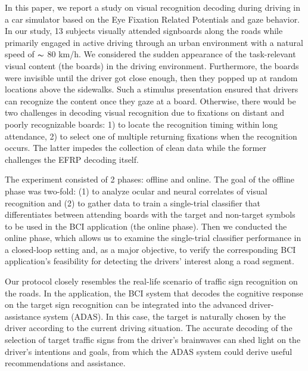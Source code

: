 \documentclass[12pt]{iopart}
\begin{document}
In this paper, we report a study on visual recognition decoding during driving
in a car simulator based on the Eye Fixation Related
Potentials and gaze behavior. 
In our study, 13 subjects visually attended signboards along the roads
while primarily engaged in active driving through
an urban environment with a natural speed of $\thicksim$ 80 km/h. 
We considered the sudden appearance of the task-relevant visual content (the boards) in the driving environment.
Furthermore, the boards were invisible until the driver got close enough,
then they popped up at random locations above the sidewalks.
Such a stimulus presentation ensured 
that drivers can recognize the content once they gaze at a board.
Otherwise, there would be two challenges in decoding
visual recognition due to fixations on distant
and poorly recognizable boards:
1) to locate the recognition timing within long attendance,
2) to select one of multiple returning fixations when the recognition occurs.
The latter impedes the collection of clean data while the former challenges
the EFRP decoding itself.

The experiment consisted of 2 phases: offline and online.
The goal of the offline phase was two-fold: (1) to analyze ocular
and neural correlates of visual recognition and (2) to gather data to train a single-trial classifier that differentiates between attending boards with the target and non-target symbols to be used in the BCI application (the online phase).
Then we conducted the online phase, which allows us to examine the single-trial classifier performance in a closed-loop setting and, as a major objective, to verify the corresponding BCI application's feasibility for detecting the drivers' interest along a road segment.

Our protocol closely resembles the real-life scenario of traffic sign
recognition on the roads. In the application, 
the BCI system that decodes the cognitive response on the target sign
recognition can be integrated into the advanced driver-assistance system
(ADAS).
In this case, the target is naturally chosen by the driver
according to the current driving situation. 
The accurate decoding of the selection of target traffic signs 
from the driver’s brainwaves can shed light on the driver’s intentions
and goals, from which the ADAS system could derive useful 
recommendations and assistance.

\end{document}
